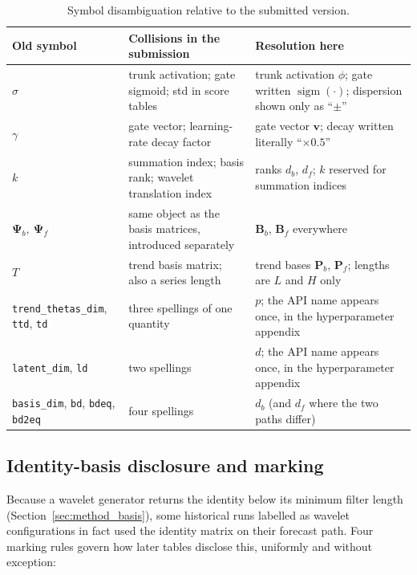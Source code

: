 \begin{table}[t]
\centering
\small
\caption{Symbol disambiguation relative to the submitted version.}
\label{tab:notation_disambiguation}
\begin{tabular}{@{}lll@{}}
\toprule
Old symbol & Collisions in the submission & Resolution here \\
\midrule
$\sigma$ & trunk activation; gate sigmoid; std in score tables &
  trunk activation $\phi$; gate written $\operatorname{sigm}(\cdot)$;
  dispersion shown only as ``$\pm$'' \\
$\gamma$ & gate vector; learning-rate decay factor &
  gate vector $\mathbf{v}$; decay written literally ``$\times0.5$'' \\
$k$ & summation index; basis rank; wavelet translation index &
  ranks $d_b$, $d_f$; $k$ reserved for summation indices \\
$\boldsymbol{\Psi}_b,\ \boldsymbol{\Psi}_f$
  & same object as the basis matrices, introduced separately &
  $\mathbf{B}_b$, $\mathbf{B}_f$ everywhere \\
$T$ & trend basis matrix; also a series length &
  trend bases $\mathbf{P}_b$, $\mathbf{P}_f$; lengths are $L$ and $H$ only \\
\texttt{trend\_thetas\_dim}, \texttt{ttd}, \texttt{td}
  & three spellings of one quantity &
  $p$; the API name appears once, in the hyperparameter appendix \\
\texttt{latent\_dim}, \texttt{ld}
  & two spellings &
  $d$; the API name appears once, in the hyperparameter appendix \\
\texttt{basis\_dim}, \texttt{bd}, \texttt{bdeq}, \texttt{bd2eq}
  & four spellings &
  $d_b$ (and $d_f$ where the two paths differ) \\
\bottomrule
\end{tabular}
\end{table}

\subsection{Identity-basis disclosure and marking}
\label{sec:method_identity}

Because a wavelet generator returns the identity below its minimum filter
length (Section~\ref{sec:method_basis}), some historical runs labelled as
wavelet configurations in fact used the identity matrix on their forecast
path. Four marking rules govern how later tables disclose this, uniformly and
without exception:

